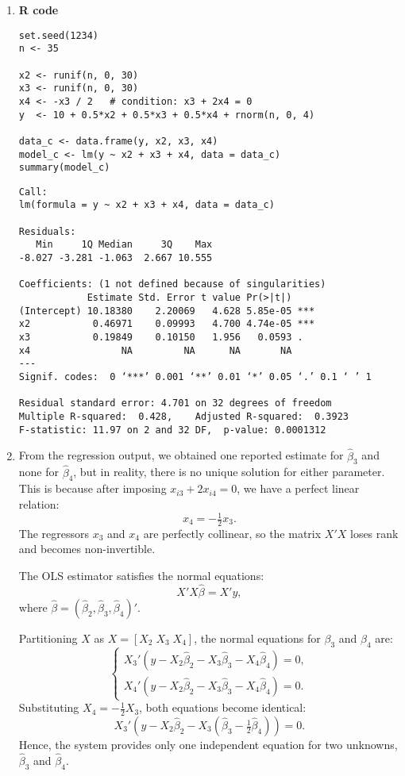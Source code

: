 \begin{enumerate}[label=(\roman*)]

\item 
\noindent\textbf{R code}

\begin{verbatim}
set.seed(1234)
n <- 35

x2 <- runif(n, 0, 30)
x3 <- runif(n, 0, 30)
x4 <- -x3 / 2   # condition: x3 + 2x4 = 0
y  <- 10 + 0.5*x2 + 0.5*x3 + 0.5*x4 + rnorm(n, 0, 4)

data_c <- data.frame(y, x2, x3, x4)
model_c <- lm(y ~ x2 + x3 + x4, data = data_c)
summary(model_c)
\end{verbatim}


\begin{verbatim}
Call:
lm(formula = y ~ x2 + x3 + x4, data = data_c)

Residuals:
   Min     1Q Median     3Q    Max 
-8.027 -3.281 -1.063  2.667 10.555 

Coefficients: (1 not defined because of singularities)
            Estimate Std. Error t value Pr(>|t|)    
(Intercept) 10.18380    2.20069   4.628 5.85e-05 ***
x2           0.46971    0.09993   4.700 4.74e-05 ***
x3           0.19849    0.10150   1.956   0.0593 .  
x4                NA         NA      NA       NA    
---
Signif. codes:  0 ‘***’ 0.001 ‘**’ 0.01 ‘*’ 0.05 ‘.’ 0.1 ‘ ’ 1

Residual standard error: 4.701 on 32 degrees of freedom
Multiple R-squared:  0.428,    Adjusted R-squared:  0.3923 
F-statistic: 11.97 on 2 and 32 DF,  p-value: 0.0001312
\end{verbatim}

\item

From the regression output, we obtained one reported estimate for $\hat{\beta}_3$ 
and none for $\hat{\beta}_4$, but in reality, there is no unique solution for either parameter. 
This is because after imposing $x_{i3} + 2x_{i4} = 0$, we have a perfect linear relation:
\[
x_4 = -\tfrac{1}{2}x_3.
\]
The regressors $x_3$ and $x_4$ are perfectly collinear, so the matrix $X'X$ loses rank 
and becomes non-invertible.

The OLS estimator satisfies the normal equations:
\[
X'X\hat{\beta} = X'y,
\]
where $\hat{\beta} = (\hat{\beta}_2, \hat{\beta}_3, \hat{\beta}_4)'$.

Partitioning $X$ as $X = [X_2 \; X_3 \; X_4]$, the normal equations for $\beta_3$ and $\beta_4$ are:
\[
\begin{cases}
X_3'(y - X_2\hat{\beta}_2 - X_3\hat{\beta}_3 - X_4\hat{\beta}_4) = 0, \\
X_4'(y - X_2\hat{\beta}_2 - X_3\hat{\beta}_3 - X_4\hat{\beta}_4) = 0.
\end{cases}
\]
Substituting $X_4 = -\tfrac{1}{2}X_3$, both equations become identical:
\[
X_3'(y - X_2\hat{\beta}_2 - X_3(\hat{\beta}_3 - \tfrac{1}{2}\hat{\beta}_4)) = 0.
\]
Hence, the system provides only one independent equation for two unknowns, $\hat{\beta}_3$ and $\hat{\beta}_4$.


\end{enumerate}
